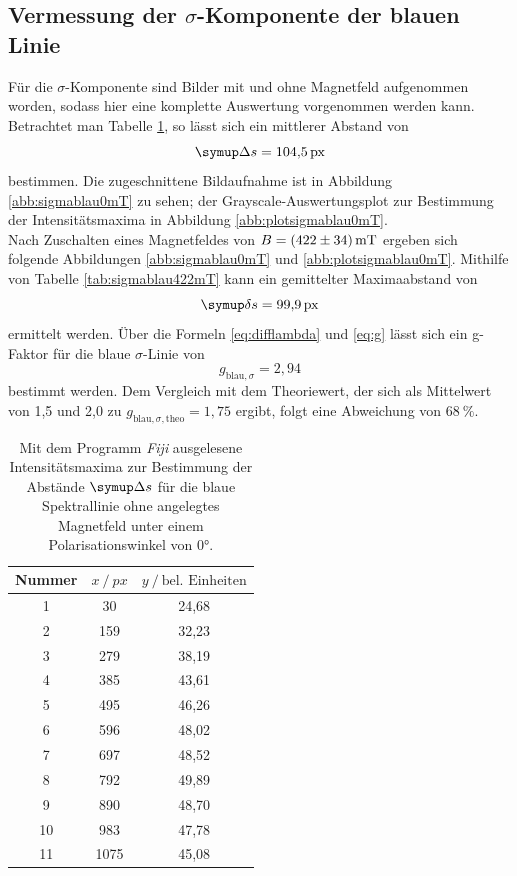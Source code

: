 \subsection{Vermessung der \texorpdfstring{$\sigma$}{sigma}-Komponente der blauen Linie}
Für die $\sigma$-Komponente sind Bilder mit und ohne Magnetfeld aufgenommen worden, sodass hier eine komplette Auswertung vorgenommen werden kann. Betrachtet man Tabelle \ref{tab:sigmablau0mT}, so lässt sich ein mittlerer Abstand von
\begin{equation}
  \Deltaup s=\SI{104,5}{px}
\end{equation}
bestimmen. Die zugeschnittene Bildaufnahme ist in Abbildung \ref{abb:sigmablau0mT} zu sehen; der Grayscale-Auswertungsplot zur Bestimmung der Intensitätsmaxima in Abbildung \ref{abb:plotsigmablau0mT}.\\
Nach Zuschalten eines Magnetfeldes von $B=\SI{422\pm34}{\milli\tesla}$ ergeben sich folgende Abbildungen \ref{abb:sigmablau0mT} und \ref{abb:plotsigmablau0mT}. Mithilfe von Tabelle \ref{tab:sigmablau422mT} kann ein gemittelter Maximaabstand von
\begin{equation}
\deltaup s=\SI{99,9}{px}
\end{equation}
ermittelt werden.
Über die Formeln \eqref{eq:difflambda} und \eqref{eq:g} lässt sich ein g-Faktor für die blaue $\sigma$-Linie von
\begin{equation}
 g_{\text{blau},\sigma}=2,94
\end{equation}
bestimmt werden. Dem Vergleich mit dem Theoriewert, der sich als Mittelwert von 1,5 und 2,0 zu $g_{\text{blau},\sigma,\text{theo}}=1,75$ ergibt, folgt eine Abweichung von $\SI{68}{\%}$.

\begin{table}[H]
  \centering
  \caption{Mit dem Programm \textit{Fiji} \cite{Fiji} ausgelesene Intensitätsmaxima zur Bestimmung der Abstände $\Deltaup s$ für die blaue Spektrallinie ohne angelegtes Magnetfeld unter einem Polarisationswinkel von $0°$.}
  \label{tab:sigmablau0mT}
  \begin{tabular}{c|cc}
    \toprule
    {Nummer} & {$x \:/\: \si{px}$} & {$y \:/\: \text{bel. Einheiten}$}\\
    \midrule
 1 &   30  &	 24,68 \\
 2 &   159  &	 32,23 \\
 3 &  279  &	 38,19 \\
 4 &  385  &	 43,61 \\
 5 &  495  &	 46,26 \\
 6 &  596  &	 48,02 \\
 7 &  697  &	 48,52 \\
 8 &  792  &	 49,89 \\
 9 &  890  &   48,70 \\
10 &  983  &	 47,78 \\
11 &  1075  &	 45,08 \\
  \end{tabular}
\end{table}

